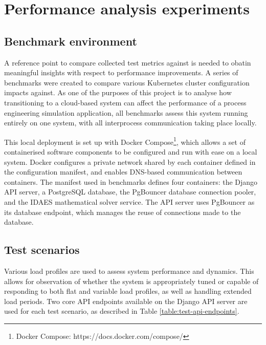 \section{Performance analysis experiments}
\subsection{Benchmark environment}

A reference point to compare collected test metrics against is needed to obatin meaningful insights with respect to performance improvements. A series of benchmarks were created to compare various Kubernetes cluster configuration impacts against. As one of the purposes of this project is to analyse how transitioning to a cloud-based system can affect the performance of a process engineering simulation application, all benchmarks assess this system running entirely on one system, with all interprocess communication taking place locally.

This local deployment is set up with Docker Compose\footnote{Docker Compose: https://docs.docker.com/compose/}, which allows a set of containerised software components to be configured and run with ease on a local system. Docker configures a private network shared by each container defined in the configuration manifest, and enables DNS-based communication between containers. The manifest used in benchmarks defines four containers: the Django API server, a PostgreSQL database, the PgBouncer database connection pooler, and the IDAES mathematical solver service. The API server uses PgBouncer as its database endpoint, which manages the reuse of connections made to the database. 

\subsection{Test scenarios}

Various load profiles are used to assess system performance and dynamics. This allows for observation of whether the system is appropriately tuned or capable of responding to both flat and variable load profiles, as well as handling extended load periods. Two core API endpoints available on the Django API server are used for each test scenario, as described in Table \ref{table:test-api-endpoints}.

